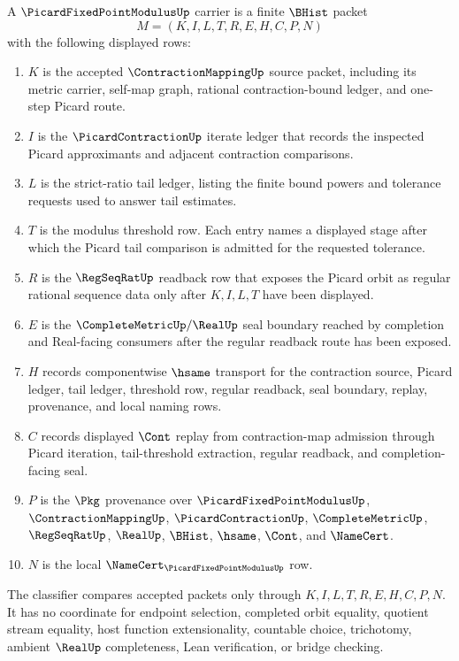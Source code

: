 \begin{definition}
\label{def:picard-fixed-point-modulus-carrier}
A $\PicardFixedPointModulusUp$ carrier is a finite $\BHist$ packet
$$
M=(K,I,L,T,R,E,H,C,P,N)
$$
with the following displayed rows:
\begin{enumerate}
\item $K$ is the accepted $\ContractionMappingUp$ source packet, including its metric carrier, self-map graph, rational contraction-bound ledger, and one-step Picard route.
\item $I$ is the $\PicardContractionUp$ iterate ledger that records the inspected Picard approximants and adjacent contraction comparisons.
\item $L$ is the strict-ratio tail ledger, listing the finite bound powers and tolerance requests used to answer tail estimates.
\item $T$ is the modulus threshold row. Each entry names a displayed stage after which the Picard tail comparison is admitted for the requested tolerance.
\item $R$ is the $\RegSeqRatUp$ readback row that exposes the Picard orbit as regular rational sequence data only after $K,I,L,T$ have been displayed.
\item $E$ is the $\CompleteMetricUp/\RealUp$ seal boundary reached by completion and Real-facing consumers after the regular readback route has been exposed.
\item $H$ records componentwise $\hsame$ transport for the contraction source, Picard ledger, tail ledger, threshold row, regular readback, seal boundary, replay, provenance, and local naming rows.
\item $C$ records displayed $\Cont$ replay from contraction-map admission through Picard iteration, tail-threshold extraction, regular readback, and completion-facing seal.
\item $P$ is the $\Pkg$ provenance over $\PicardFixedPointModulusUp$, $\ContractionMappingUp$, $\PicardContractionUp$, $\CompleteMetricUp$, $\RegSeqRatUp$, $\RealUp$, $\BHist$, $\hsame$, $\Cont$, and $\NameCert$.
\item $N$ is the local $\NameCert_{\PicardFixedPointModulusUp}$ row.
\end{enumerate}
The classifier compares accepted packets only through $K,I,L,T,R,E,H,C,P,N$. It has no coordinate for endpoint selection, completed orbit equality, quotient stream equality, host function extensionality, countable choice, trichotomy, ambient $\RealUp$ completeness, Lean verification, or bridge checking.
\end{definition}

